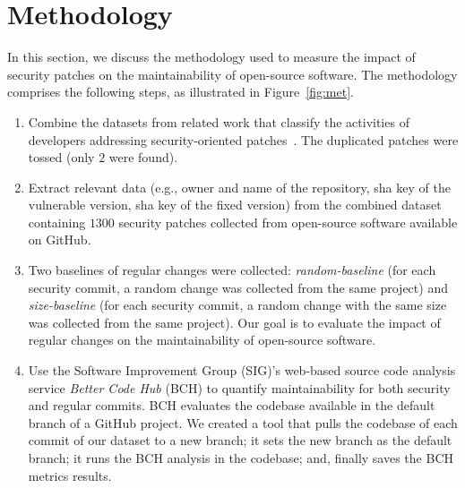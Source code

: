 \documentclass[smallextended]{svjour3}       %
\begin{document}
\section{Methodology}\label{sec:methodology}
%

In this section, we discuss the methodology used to measure
the impact of security patches on the maintainability of open-source
software. The methodology comprises the following steps, as 
illustrated in Figure~\ref{fig:met}.
%
\begin{enumerate}
	\item Combine the datasets from related work that classify
	the activities of developers addressing security-oriented 
  patches~\cite{reis2017secbench,10.1109/MSR.2019.00064}. The
  duplicated patches were tossed (only $2$ were found).
%
	\item
	Extract relevant data (e.g., owner and name of
	the repository, sha key of the vulnerable version, sha key of 	
	the fixed version) from the combined dataset 	
	containing $1300$ security patches collected from open-source 	
	software available on GitHub.
%
  \item Two baselines of regular changes were collected:
  \textit{random-baseline} (for each security commit, a random change 
  was collected from the same project) and \textit{size-baseline} (for 
  each security commit, a random change with the same size
  was collected from the same project). Our goal is to evaluate the impact 
	of regular changes on the maintainability of open-source 
	software.
%
  \item Use the Software Improvement Group (SIG)'s web-based source 
  code analysis service \emph{Better Code Hub} (BCH)
  to quantify maintainability for both security and regular commits. 
  BCH evaluates the codebase available in the default branch of a GitHub project. 
  We created a tool that pulls the codebase of each commit of our dataset 
  to a new branch; it sets the new branch as the default branch; it runs 
  the BCH analysis in the codebase; and, finally saves the BCH metrics
  results.
\end{enumerate}
%
\end{document}
